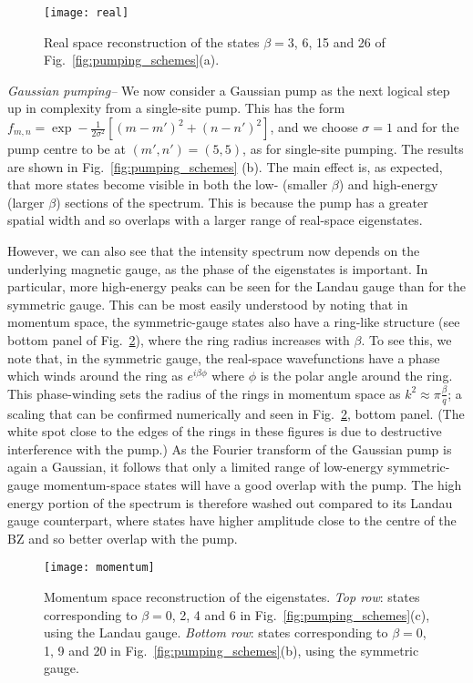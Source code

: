 \begin{figure}[tb] \centering
  \texttt{[image: real]}
  \caption{Real space reconstruction of the states $\beta=3$, 6, 15
and 26 of Fig.~\ref{fig:pumping_schemes}(a).}
  \label{fig:delta_real_sp}
\end{figure}

{\em{Gaussian pumping--}} We now consider a Gaussian pump as the next
logical step up in complexity from a single-site pump. This has the
form $f_{m,n} = \exp- \frac{1}{2\sigma^2} \left[(m-m')^2 + (n-n')^2
\right]$, and we choose $\sigma =1$ and for the pump centre to be at
$(m',n') = (5,5)$, as for single-site pumping. The results are shown
in Fig.~\ref{fig:pumping_schemes} (b). The main effect is, as
expected, that more states become visible in both the low- (smaller
$\beta$) and high-energy (larger $\beta$) sections of the
spectrum. This is because the pump has a greater spatial width and so
overlaps with a larger range of real-space eigenstates.

However, we can also see that the intensity spectrum now depends on
the underlying magnetic gauge, as the phase of the eigenstates is
important. In particular, more high-energy peaks can be seen for the
Landau gauge than for the symmetric gauge. This can be most easily
understood by noting that in momentum space, the symmetric-gauge
states also have a ring-like structure (see bottom panel of
Fig.~\ref{fig:hom_mom_sp}), where the ring radius increases with
$\beta$. To see this, we note that, in the symmetric gauge, the
real-space wavefunctions have a phase which winds around the ring as
$e^{i\beta \phi}$ where $\phi$ is the polar angle around the
ring. This phase-winding sets the radius of the rings in momentum
space as $k^2 \approx \pi \frac{\beta}{q}$; a scaling that can be
confirmed numerically and seen in Fig.~\ref{fig:hom_mom_sp}, bottom
panel. (The white spot close to the edges of the rings in these
figures is due to destructive interference with the pump.)  As the
Fourier transform of the Gaussian pump is again a Gaussian, it follows
that only a limited range of low-energy symmetric-gauge momentum-space
states will have a good overlap with the pump. The high energy portion
of the spectrum is therefore washed out compared to its Landau gauge
counterpart, where states have higher amplitude close to the centre of
the BZ and so better overlap with the pump.

\begin{figure}[tb]\centering
  \texttt{[image: momentum]}
  \caption{Momentum space reconstruction of the eigenstates. \emph{Top
row}: states corresponding to $\beta=0$, 2, 4 and 6 in
Fig.~\ref{fig:pumping_schemes}(c), using the Landau gauge.
\emph{Bottom row}: states corresponding to $\beta=0$, 1, 9 and 20 in
Fig.~\ref{fig:pumping_schemes}(b), using the symmetric gauge.}
  \label{fig:hom_mom_sp}
\end{figure}


